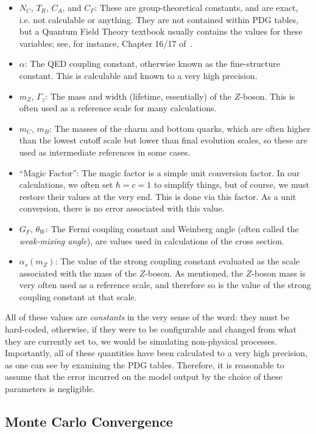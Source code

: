 \begin{itemize}
\item $N_C$, $T_R$, $C_A$, and $C_F$: These are group-theoretical constants, and are exact, i.e. not calculable or anything. They are not contained within PDG tables, but a Quantum Field Theory textbook usually contains the values for these variables; see, for instance, Chapter 16/17 of~\cite{peskin-schroeder}.
\item $\alpha$: The QED coupling constant, otherwise known as the fine-structure constant. This is calculable and known to a very high precision.
\item $m_Z$, $\Gamma_z$: The mass and width (lifetime, essentially) of the $Z$-boson. This is often used as a reference scale for many calculations.
\item $m_C$, $m_B$: The masses of the charm and bottom quarks, which are often higher than the lowest cutoff scale but lower than final evolution scales, so these are used as intermediate references in some cases.
\item ``Magic Factor'': The magic factor is a simple unit conversion factor. In our calculations, we often set $\hbar=c=1$ to simplify things, but of course, we must restore their values at the very end. This is done via this factor. As a unit conversion, there is no error associated with this value.
\item $G_F$, $\theta_W$: The Fermi coupling constant and Weinberg angle (often called the \textit{weak-mixing angle}), are values used in calculations of the cross section.
\item $\alpha_s(m_Z)$: The value of the strong coupling constant evaluated as the scale associated with the mass of the $Z$-boson. As mentioned, the $Z$-boson mass is very often used as a reference scale, and therefore so is the value of the strong coupling constant at that scale.
\end{itemize}

All of these values are \textit{constants} in the very sense of the word: they must be hard-coded, otherwise, if they were to be configurable and changed from what they are currently set to, we would be simulating non-physical processes. Importantly, all of these quantities have been calculated to a very high precision, as one can see by examining the PDG tables. Therefore, it is reasonable to assume that the error incurred on the model output by the choice of these parameters is negligible.


\subsection{Monte Carlo Convergence}

